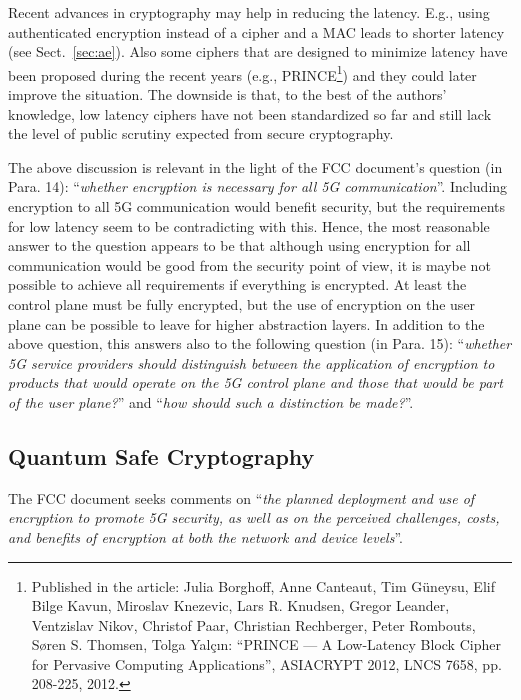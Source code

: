 \documentclass[12pt]{llncs}
\newcommand\ques[1]{``\emph{#1}''}
\begin{document}
Recent advances in cryptography may help in reducing the latency. E.g., using authenticated encryption instead of a cipher and a MAC leads to shorter latency (see Sect.~\ref{sec:ae}). Also some ciphers that are designed to minimize latency have been proposed during the recent years (e.g., PRINCE\footnote{Published in the article: Julia Borghoff, Anne Canteaut, Tim Güneysu, Elif Bilge Kavun, Miroslav Knezevic, Lars R. Knudsen, Gregor Leander, Ventzislav Nikov, Christof Paar, Christian Rechberger, Peter Rombouts, Søren S. Thomsen, Tolga Yalçın: ``PRINCE --- A Low-Latency Block Cipher for Pervasive Computing Applications'', ASIACRYPT 2012, LNCS 7658, pp. 208-225, 2012.}) and they could later improve the situation. The downside is that, to the best of the authors' knowledge, low latency ciphers have not been standardized so far and still lack the level of public scrutiny expected from secure cryptography.

The above discussion is relevant in the light of the FCC document's question (in Para. 14): \ques{whether encryption is necessary for all 5G communication}. Including encryption to all 5G communication would benefit security, but the requirements for low latency seem to be contradicting with this. Hence, the most reasonable answer to the question appears to be that although using encryption for all communication would be good from the security point of view, it is maybe not possible to achieve all requirements if everything is encrypted. At least the control plane must be fully encrypted, but the use of encryption on the user plane can be possible to leave for higher abstraction layers. In addition to the above question, this answers also to the following question (in Para. 15): \ques{whether 5G service providers should distinguish between the application of encryption to products that would operate on the 5G control plane and those that would be part of the user plane?} and \ques{how should such a distinction be made?}.

\subsection{Quantum Safe Cryptography}
\label{sec:qsc}

The FCC document seeks comments on \ques{the planned deployment and use of encryption to promote 5G security, as well as on the perceived challenges, costs, and benefits of encryption at both the network and device levels}. 
\end{document}
